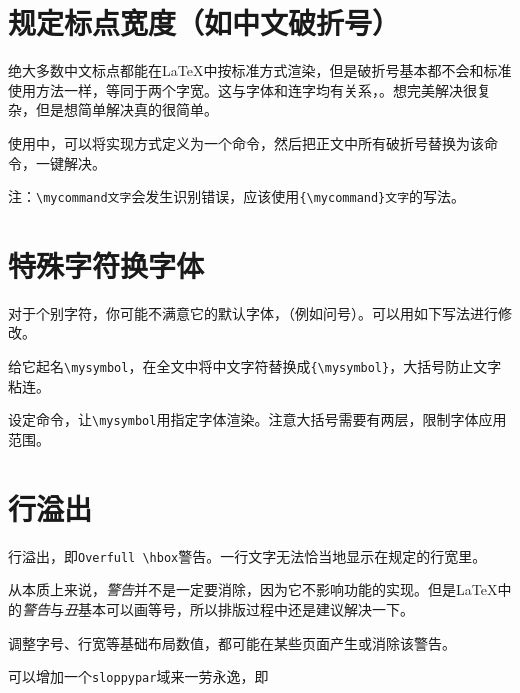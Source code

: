 \documentclass[10pt,openany]{book}
\begin{document}
\begin{sloppypar}
\section{规定标点宽度（如中文破折号）}
\label{chsline}

绝大多数中文标点都能在{\LaTeX}中按标准方式渲染，但是破折号基本都不会和标准使用方法一样，等同于两个字宽。这与字体和连字均有关系，。想完美解决很复杂，但是想简单解决真的很简单。



使用中，可以将实现方式定义为一个命令，然后把正文中所有破折号替换为该命令，一键解决。

注：\texttt{\textbackslash{}mycommand\hspace{-0.1em}文字}会发生识别错误，应该使用\texttt{\{\textbackslash{}mycommand\}文字}的写法。

\section{特殊字符换字体}

对于个别字符，你可能不满意它的默认字体，（例如问号）。可以用如下写法进行修改。

给它起名\texttt{\textbackslash{}mysymbol}，在全文中将中文字符替换成\texttt{\{\textbackslash{}mysymbol\}}，大括号防止文字粘连。

设定命令，让\texttt{\textbackslash{}mysymbol}用指定字体渲染。注意大括号需要有两层，限制字体应用范围。



\section{行溢出}

行溢出，即\texttt{Overfull\ \textbackslash{}hbox}警告。一行文字无法恰当地显示在规定的行宽里。

从本质上来说，\textit{警告}并不是一定要消除，因为它不影响功能的实现。但是{\LaTeX}中的\textit{警告}与\textit{丑}基本可以画等号，所以排版过程中还是建议解决一下。

调整字号、行宽等基础布局数值，都可能在某些页面产生或消除该警告。

可以增加一个\texttt{sloppypar}域来一劳永逸，即




\end{sloppypar}
\end{document}

